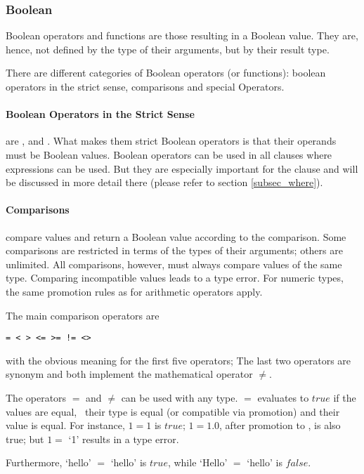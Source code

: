 \subsubsection{Boolean}
Boolean operators and functions
are those resulting in a Boolean value.
They are, hence, not defined by the type
of their arguments, but by their result type.

There are different categories of Boolean
operators (or functions):
boolean operators in the strict sense,
comparisons and special Operators.

\paragraph{Boolean Operators in the Strict Sense}
are ,  and .
What makes them strict Boolean operators is
that their operands must be Boolean values.
Boolean operators can be used in all clauses
where expressions can be used.
But they are especially important for the
 clause and will be discussed
in more detail there (please refer to section
\ref{subsec_where}).

\paragraph{Comparisons}
compare values and return
a Boolean value according to the comparison.
Some comparisons are restricted in terms
of the types of their arguments;
others are unlimited. All comparisons, however,
must always compare values of the same type.
Comparing incompatible values leads to a type error.
For numeric types, the same promotion rules
as for arithmetic operators apply.

The main comparison operators are
\begin{verbatim}
= < > <= >= != <>
\end{verbatim}
with the obvious meaning for
the first five operators;
The last two operators
are synonym and both implement
the mathematical operator $\neq$.

The operators $=$ and $\neq$ can be used
with any type. $=$ evaluates to $true$
if the values are equal, \ie\
their type is equal (or compatible
via promotion) and their value
is equal. For instance,
$1 = 1$ is $true$;
$1 = 1.0$, after promotion to ,
is also true; but
$1 =$ `1' results in a type error.

Furthermore, `hello' $=$ `hello'
is $true$, while `Hello' $=$ `hello'
is $false$.

